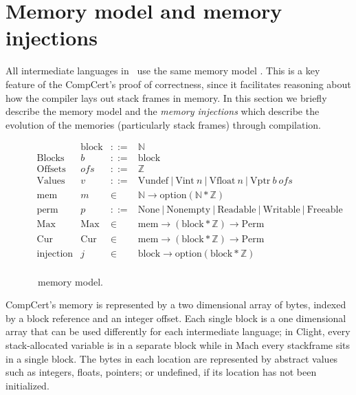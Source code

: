 \section{Memory model and memory injections}\label{sec:compcert-mem}

All intermediate languages in \compcert\ use the same memory model \cite{Leroy-Blazy-memory-model}. This is a key feature of the CompCert's proof of correctness, since it facilitates reasoning about how the compiler lays out stack frames in memory. In this section we briefly describe the memory model and the \emph{memory injections} which describe the evolution of the memories (particularly stack frames) through compilation.


\begin{figure}
$$\begin{array}{rccl} 
&\text{block}& ::= & \mathbb{N} \\
\text{Blocks} &  b & ::= &\text{block} \\
\text{Offsets} & ofs & ::= & \mathbb{Z} \\
\text{Values} & v & ::= & \text{Vundef} \ |\  \text{Vint}\ n \ |\  \text{Vfloat}\ n \ |\  \text{Vptr}\ b\ ofs \\
\text{mem} & m & \in & \mathbb{N} \rightarrow \text{option} (\mathbb{N} * \mathbb{Z}) \\
\text{perm} & p & ::= & \text{None} \ |\  \text{Nonempty} \ |\  \text{Readable} \ |\  \text{Writable} \ |\  \text{Freeable} \\
\text{Max perm} & \text{Max} & \in & \text{mem}\rightarrow (\text{block} * \mathbb{Z}) \rightarrow \text{Perm} \\
\text{Cur perm} & \text{Cur} & \in & \text{mem}\rightarrow (\text{block} * \mathbb{Z}) \rightarrow \text{Perm} \\
\text{injection}& j& \in & \text{block} \rightarrow \text{option} (\text{block} * \mathbb{Z})\\
\end{array}$$
\caption{\compcert\ memory model.}
\end{figure}
CompCert's memory is represented by a two dimensional array of bytes, indexed by a block reference and an integer offset. Each single block is a one dimensional array that can be used differently for each intermediate language; in Clight, every stack-allocated variable is in a separate block while in Mach every stackframe sits in a single block. The bytes in each location are represented by abstract values such as integers, floats, pointers; or undefined, if its location has not been initialized. 
  

